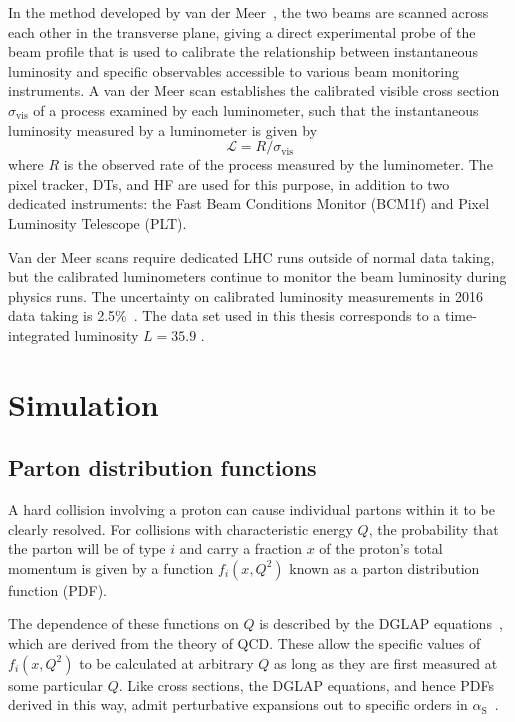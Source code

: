 \documentclass[oneside, letterpaper, 12pt, oldfontcommands]{memoir}
\begin{document}
In the method developed
by van der Meer~\cite{ref:CERN-ISR-PO-68-31}, the two beams are scanned across each other in the transverse plane, giving a direct experimental
probe of the beam profile that is used to calibrate the relationship between instantaneous luminosity and specific observables accessible to various
beam monitoring instruments. A van der Meer scan establishes the calibrated visible cross section $\sigma_\mathrm{vis}$ of a process examined
by each luminometer, such that the instantaneous luminosity measured by a luminometer is given by
\begin{equation}
\mathcal{L} = R / \sigma_\mathrm{vis}
\label{eq:lumi_calibration}
\end{equation}
where $R$ is the observed rate of the process measured by the luminometer. The pixel tracker, DTs, and HF are used for this purpose, in addition to two
dedicated instruments: the Fast Beam Conditions Monitor (BCM1f) and Pixel Luminosity Telescope (PLT).

Van der Meer scans require dedicated LHC runs outside of normal data taking, but the calibrated luminometers continue to monitor the beam luminosity
during physics runs. The uncertainty on calibrated luminosity measurements in 2016 data taking is 2.5\%~\cite{ref:CMS-PAS-LUM-17-001}.
The data set used in this thesis corresponds to a time-integrated luminosity $L = 35.9$ \fbinv.

\chapter{Simulation} \label{chap:simulation}
\section{Parton distribution functions} \label{sec:simulation_pdf}
A hard collision involving a proton can cause individual partons within it to be clearly resolved.
For collisions with characteristic energy $Q$, the probability that the parton will be of type $i$
and carry a fraction $x$ of the proton's total momentum is given by a function $f_{i}(x, Q^{2})$
known as a parton distribution function (PDF).

The dependence of these functions on $Q$ is described by the DGLAP equations~\cite{ref:0370-2693(71)90576-4, ref:dokshitzer, ref:0550-3213(77)90384-4},
which are derived from the theory of QCD.
These allow the specific values of $f_{i}(x, Q^{2})$ to be calculated at arbitrary $Q$ as long as they
are first measured at some particular $Q$.
Like cross sections, the DGLAP equations, and hence PDFs derived in this way, admit perturbative expansions out to specific orders in
$\alpha_\mathrm{S}$~\cite{ref:0034-4885/70/1/R02}.
\end{document}
